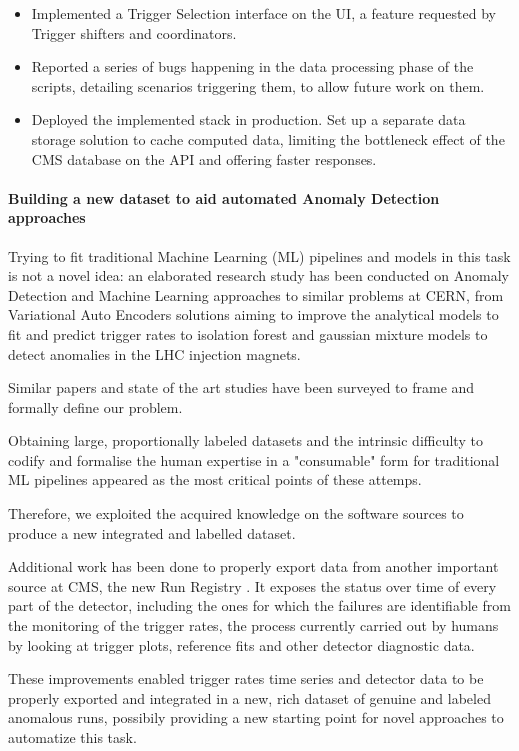 \documentclass[a4, oneside, 10pt, nobib]{memoir}
\begin{document}
\begin{itemize}
		\item Implemented a Trigger Selection interface on the UI, a feature requested by Trigger shifters and coordinators.
		\item Reported a series of bugs happening in the data processing phase of the scripts, detailing scenarios triggering them, to allow future work on them.
		\item Deployed the implemented stack in production. Set up a separate data storage solution to cache computed data, limiting the bottleneck effect of the CMS database on the API and offering faster responses.

		\end{itemize}


		\paragraph{Building a new dataset to aid automated Anomaly Detection approaches}

		Trying to fit traditional Machine Learning (ML) pipelines and models in this task is not a novel idea: an elaborated research study has been conducted on Anomaly Detection and Machine Learning approaches to similar problems at CERN, from Variational Auto Encoders solutions \cite{adpol-cvae}aiming to improve the analytical models to fit and predict trigger rates to isolation forest and gaussian mixture models \cite{Halilovic:2665985} to detect anomalies in the LHC injection magnets.

		Similar papers and state of the art studies have been surveyed to frame and formally define our problem.

		Obtaining large, proportionally labeled datasets and the intrinsic difficulty to codify and formalise the human expertise in a "consumable" form for traditional ML pipelines appeared as the most critical points of these attemps.

		Therefore, we exploited the acquired knowledge on the software sources to produce a new integrated and labelled dataset.

		Additional work has been done to properly export data from another important source at CMS, the new Run Registry \cite{cms_collaboration_2019_3599323}. It exposes the status over time of every part of the detector, including the ones for which the failures are identifiable from the monitoring of the trigger rates, the process currently carried out by humans by looking at trigger plots, reference fits and other detector diagnostic data.

		These improvements enabled trigger rates time series and detector data to be properly exported and integrated in a new, rich dataset of genuine and labeled anomalous runs, possibily providing a new starting point for novel approaches to automatize this task.

\thispagestyle{empty}
 
\printbibliography
\end{document}
